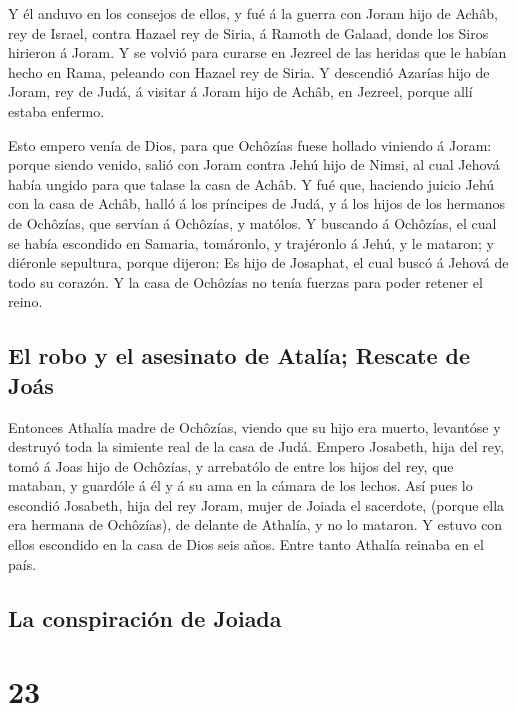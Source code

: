  Y él anduvo en los consejos de ellos, y fué á la guerra con
Joram hijo de Achâb, rey de Israel, contra Hazael rey de Siria, á Ramoth
de Galaad, donde los Siros hirieron á Joram.  Y se volvió
para curarse en Jezreel de las heridas que le habían hecho en Rama,
peleando con Hazael rey de Siria. Y descendió Azarías hijo de Joram, rey
de Judá, á visitar á Joram hijo de Achâb, en Jezreel, porque allí estaba
enfermo.

 Esto empero venía de Dios, para que Ochôzías fuese hollado
viniendo á Joram: porque siendo venido, salió con Joram contra Jehú hijo
de Nimsi, al cual Jehová había ungido para que talase la casa de Achâb.
 Y fué que, haciendo juicio Jehú con la casa de Achâb, halló
á los príncipes de Judá, y á los hijos de los hermanos de Ochôzías, que
servían á Ochôzías, y matólos.  Y buscando á Ochôzías, el
cual se había escondido en Samaria, tomáronlo, y trajéronlo á Jehú, y le
mataron; y diéronle sepultura, porque dijeron: Es hijo de Josaphat, el
cual buscó á Jehová de todo su corazón. Y la casa de Ochôzías no tenía
fuerzas para poder retener el reino.

\hypertarget{el-robo-y-el-asesinato-de-ataluxeda-rescate-de-jouxe1s}{%
\subsection{El robo y el asesinato de Atalía; Rescate de
Joás}\label{el-robo-y-el-asesinato-de-ataluxeda-rescate-de-jouxe1s}}

 Entonces Athalía madre de Ochôzías, viendo que su hijo era
muerto, levantóse y destruyó toda la simiente real de la casa de Judá.
 Empero Josabeth, hija del rey, tomó á Joas hijo de
Ochôzías, y arrebatólo de entre los hijos del rey, que mataban, y
guardóle á él y á su ama en la cámara de los lechos. Así pues lo
escondió Josabeth, hija del rey Joram, mujer de Joiada el sacerdote,
(porque ella era hermana de Ochôzías), de delante de Athalía, y no lo
mataron.  Y estuvo con ellos escondido en la casa de Dios
seis años. Entre tanto Athalía reinaba en el país.

\hypertarget{la-conspiraciuxf3n-de-joiada}{%
\subsection{La conspiración de
Joiada}\label{la-conspiraciuxf3n-de-joiada}}

\hypertarget{section-22}{%
\section{23}\label{section-22}}


